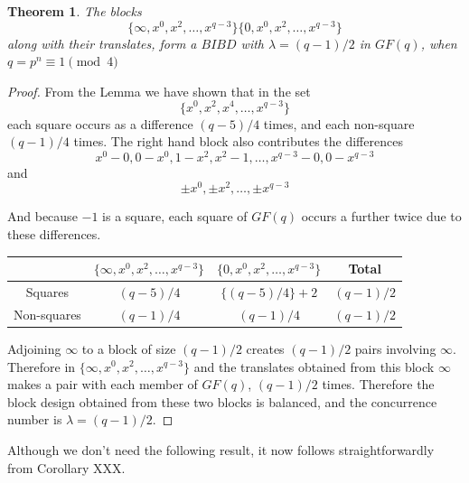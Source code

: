 \documentclass[
  11pt,
  a4paper]{book}
\newtheorem{theorem}{Theorem}
\begin{document}
\begin{theorem}
The blocks
\begin{equation}
\{\infty, x^0, x^2, \ldots, x^{q - 3}\}\{0, x^0, x^2, \ldots, x^{q - 3}\}
\end{equation}
along with their translates, form a $BIBD$ with
$\lambda = (q - 1)/2$ in $GF(q)$, when
$q = p^n \equiv 1\pmod 4$
\end{theorem}
\begin{proof}
From the Lemma we have shown that in the set
\begin{equation}
\{x^0, x^2, x^4, \ldots, x^{q - 3}\}
\end{equation}
each square occurs as a difference
$(q - 5)/4$ times, and each non-square $(q-1)/4$ times.
The right hand block also contributes the differences
\begin{equation}
x^0 - 0, 0 - x^0, 1 - x^2, x^2 - 1, \ldots, x^{q - 3} - 0, 0 - x^{q - 3}
\end{equation}
and
\begin{equation}
\pm x^0, \pm x^2, \ldots ,\pm x^{q - 3}
\end{equation}

And because $-1$ is a square, each square of $GF(q)$ occurs
a further twice due to these differences.

\begin{center}
\begin{tabular}{c|ccc}
               & $\{\infty, x^0, x^2, \ldots, x^{q - 3}\}$ & $\{0, x^0, x^2, \ldots,x^{q - 3}\}$ &   Total     \\ \hline
     Squares   &               $(q - 5)/4$                 &         $\{(q - 5)/4\} + 2$         & $(q - 1)/2$ \\
   Non-squares &               $(q - 1)/4$                 &              $(q - 1)/4$            & $(q - 1)/2$ \\
\end{tabular}
\end{center}

Adjoining $\infty$ to a block of size $(q - 1)/2$ creates
$(q - 1)/2$ pairs involving $\infty$. Therefore in
$\{\infty, x^0, x^2, \ldots, x^{q - 3}\}$ and the translates
obtained from this block $\infty$ makes a pair with each
member of $GF(q)$, $(q - 1)/2$ times.  Therefore the block
design obtained from these two blocks is balanced, and the
concurrence number is $\lambda = (q - 1)/2$.
\end{proof}

Although we don't need the following result, it now follows
straightforwardly from Corollary XXX.
\end{document}
